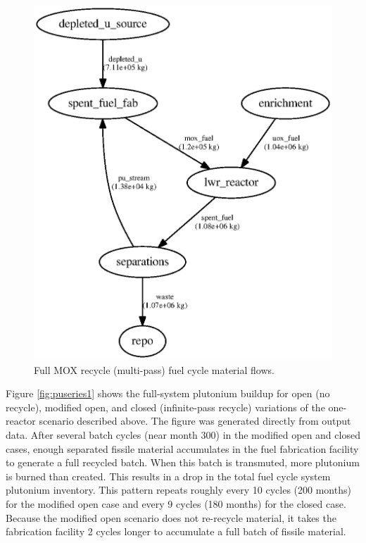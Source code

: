 \begin{figure}[H]
\begin{center}
\includegraphics{./images/flow-closed-1.eps}
\end{center}
\caption{Full \gls{MOX} recycle (multi-pass) fuel cycle material flows.}
\label{fig:flowclosed}
\end{figure}

Figure \ref{fig:puseries1} shows the full-system plutonium buildup for open
(no recycle), modified open, and closed (infinite-pass recycle) variations of
the one-reactor scenario described above. The figure was generated directly
from \Cyclus output data. After several batch cycles (near month 300) in the
modified open and closed cases, enough separated fissile material accumulates
in the fuel fabrication facility to generate a full recycled batch.  When this
batch is transmuted, more plutonium is burned than created.  This results in a
drop in the total fuel cycle system plutonium inventory.  This pattern repeats
roughly every 10 cycles (200 months) for the modified open case and every 9
cycles (180 months) for the closed case.  Because the modified open scenario
does not re-recycle material, it takes the fabrication facility 2 cycles longer
to accumulate a full batch of fissile material.

